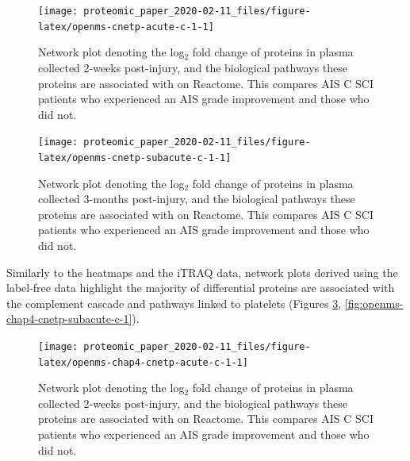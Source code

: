 \documentclass[
]{article}
\newcommand{\blandscape}{\begin{landscape}}
\newcommand{\elandscape}{\end{landscape}}
\begin{document}
\begin{landscape}
\begin{landscape}
\begin{figure}

{\centering \texttt{[image: proteomic\_paper\_2020-02-11\_files/figure-latex/openms-cnetp-acute-c-1-1]} 

}

\caption{Network plot denoting the log\(_2\) fold change of proteins in plasma collected 2-weeks post-injury, and the biological pathways these proteins are associated with on Reactome. This compares AIS C SCI patients who experienced an AIS grade improvement and those who did not.}\label{fig:openms-cnetp-acute-c-1}
\end{figure}

\elandscape
\blandscape



\begin{figure}

{\centering \texttt{[image: proteomic\_paper\_2020-02-11\_files/figure-latex/openms-cnetp-subacute-c-1-1]} 

}

\caption{Network plot denoting the log\(_2\) fold change of proteins in plasma collected 3-months post-injury, and the biological pathways these proteins are associated with on Reactome. This compares AIS C SCI patients who experienced an AIS grade improvement and those who did not.}\label{fig:openms-cnetp-subacute-c-1}
\end{figure}

\end{landscape}

\clearpage

Similarly to the heatmaps and the iTRAQ data, network plots derived using the label-free data highlight the majority of differential proteins are associated with the complement cascade and pathways linked to platelets (Figures \ref{fig:openms-chap4-cnetp-acute-c-1}, \ref{fig:openms-chap4-cnetp-subacute-c-1}).

\begin{landscape}



\begin{figure}

{\centering \texttt{[image: proteomic\_paper\_2020-02-11\_files/figure-latex/openms-chap4-cnetp-acute-c-1-1]} 

}

\caption{Network plot denoting the log\(_2\) fold change of proteins in plasma collected 2-weeks post-injury, and the biological pathways these proteins are associated with on Reactome. This compares AIS C SCI patients who experienced an AIS grade improvement and those who did not.}\label{fig:openms-chap4-cnetp-acute-c-1}
\end{figure}


\end{landscape}
\end{landscape}
\end{document}

